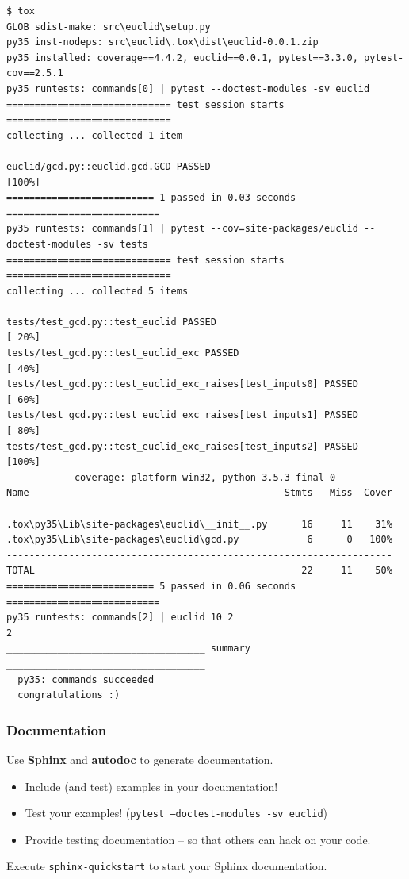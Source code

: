 \documentclass{beamer} %
\newcommand\emc[1]{\textcolor{brightblue}{\textbf{#1}}}
\begin{document}
\begin{frame}[fragile]
\begin{tiny}
\begin{verbatim}
$ tox
GLOB sdist-make: src\euclid\setup.py
py35 inst-nodeps: src\euclid\.tox\dist\euclid-0.0.1.zip
py35 installed: coverage==4.4.2, euclid==0.0.1, pytest==3.3.0, pytest-cov==2.5.1
py35 runtests: commands[0] | pytest --doctest-modules -sv euclid
============================= test session starts =============================
collecting ... collected 1 item

euclid/gcd.py::euclid.gcd.GCD PASSED                                     [100%]
========================== 1 passed in 0.03 seconds ===========================
py35 runtests: commands[1] | pytest --cov=site-packages/euclid --doctest-modules -sv tests
============================= test session starts =============================
collecting ... collected 5 items

tests/test_gcd.py::test_euclid PASSED                                    [ 20%]
tests/test_gcd.py::test_euclid_exc PASSED                                [ 40%]
tests/test_gcd.py::test_euclid_exc_raises[test_inputs0] PASSED           [ 60%]
tests/test_gcd.py::test_euclid_exc_raises[test_inputs1] PASSED           [ 80%]
tests/test_gcd.py::test_euclid_exc_raises[test_inputs2] PASSED           [100%]
----------- coverage: platform win32, python 3.5.3-final-0 -----------
Name                                             Stmts   Miss  Cover
--------------------------------------------------------------------
.tox\py35\Lib\site-packages\euclid\__init__.py      16     11    31%
.tox\py35\Lib\site-packages\euclid\gcd.py            6      0   100%
--------------------------------------------------------------------
TOTAL                                               22     11    50%
========================== 5 passed in 0.06 seconds ===========================
py35 runtests: commands[2] | euclid 10 2
2
___________________________________ summary ___________________________________
  py35: commands succeeded
  congratulations :)
\end{verbatim}
\end{tiny}

\end{frame}

\begin{frame}

\frametitle{Documentation}

Use \emc{Sphinx} and \emc{autodoc} to generate documentation. 
\begin{itemize}
  \item Include (and test) examples in your documentation!
  \item Test your examples! (\texttt{pytest --doctest-modules -sv euclid})
  \item Provide testing documentation -- so that others can hack on your code.
\end{itemize}

\vspace{3mm}
Execute \texttt{sphinx-quickstart} to start your Sphinx documentation.
\end{frame}
\end{document}
